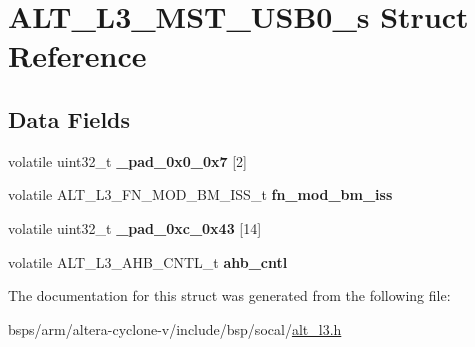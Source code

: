 \hypertarget{structALT__L3__MST__USB0__s}{}\section{A\+L\+T\+\_\+\+L3\+\_\+\+M\+S\+T\+\_\+\+U\+S\+B0\+\_\+s Struct Reference}
\label{structALT__L3__MST__USB0__s}
\subsection*{Data Fields}
\begin{DoxyCompactItemize}
\item 
\mbox{\label{structALT__L3__MST__USB0__s_a2b985518f51ee980357d2b7ce8bf0557}} 
volatile uint32\+\_\+t {\bfseries \+\_\+pad\+\_\+0x0\+\_\+0x7} \mbox{[}2\mbox{]}
\item 
\mbox{\label{structALT__L3__MST__USB0__s_ab859ec483841430108129f13def3164d}} 
volatile A\+L\+T\+\_\+\+L3\+\_\+\+F\+N\+\_\+\+M\+O\+D\+\_\+\+B\+M\+\_\+\+I\+S\+S\+\_\+t {\bfseries fn\+\_\+mod\+\_\+bm\+\_\+iss}
\item 
\mbox{\label{structALT__L3__MST__USB0__s_a932624d6468596d4fd92814daaed8c32}} 
volatile uint32\+\_\+t {\bfseries \+\_\+pad\+\_\+0xc\+\_\+0x43} \mbox{[}14\mbox{]}
\item 
\mbox{\label{structALT__L3__MST__USB0__s_a96ece3f32698e679e066821defd40295}} 
volatile A\+L\+T\+\_\+\+L3\+\_\+\+A\+H\+B\+\_\+\+C\+N\+T\+L\+\_\+t {\bfseries ahb\+\_\+cntl}
\end{DoxyCompactItemize}


The documentation for this struct was generated from the following file\+:\begin{DoxyCompactItemize}
\item 
bsps/arm/altera-\/cyclone-\/v/include/bsp/socal/\mbox{\hyperlink{alt__l3_8h}{alt\+\_\+l3.\+h}}\end{DoxyCompactItemize}
